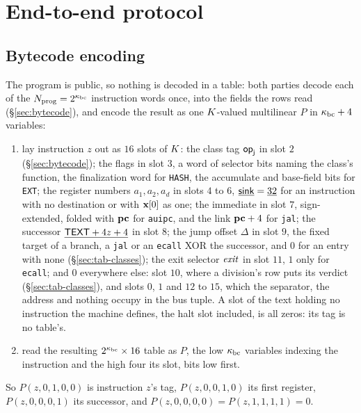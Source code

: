 \section{End-to-end protocol}\label{sec:e2e}

\subsection{Bytecode encoding}\label{sec:e2e-bc}

The program is public, so nothing is decoded in a table: both parties decode each of the $N_{\mathrm{prog}}=2^{\kappa_{\mathrm{bc}}}$ instruction words once, into the fields the rows read (\S\ref{sec:bytecode}), and encode the result as one $K$-valued multilinear $P$ in $\kappa_{\mathrm{bc}}+4$ variables:
\begin{enumerate}[itemsep=1pt,topsep=3pt]
\item lay instruction $z$ out as $16$ slots of $K$: the class tag $\mathsf{op}_{\mathsf{j}}$ in slot $2$ (\S\ref{sec:bytecode}); the flags in slot $3$, a word of selector bits naming the class's function, the finalization word for \texttt{HASH}, the accumulate and base-field bits for \texttt{EXT}; the register numbers $a_1,a_2,a_d$ in slots $4$ to $6$, $\underline{\mathsf{sink}}=\underline{32}$ for an instruction with no destination or with $\mathbf{x}[0]$ as one; the immediate in slot $7$, sign-extended, folded with $\mathbf{pc}$ for \texttt{auipc}, and the link $\mathbf{pc}+4$ for \texttt{jal}; the successor $\underline{\mathsf{TEXT}+4z+4}$ in slot $8$; the jump offset $\Delta$ in slot $9$, the fixed target of a branch, a \texttt{jal} or an \texttt{ecall} XOR the successor, and $0$ for an entry with none (\S\ref{sec:tab-classes}); the exit selector $\mathit{exit}$ in slot $11$, $1$ only for \texttt{ecall}; and $0$ everywhere else: slot $10$, where a division's row puts its verdict (\S\ref{sec:tab-classes}), and slots $0$, $1$ and $12$ to $15$, which the separator, the address and nothing occupy in the bus tuple. A slot of the text holding no instruction the machine defines, the halt slot included, is all zeros: its tag is no table's.
\item read the resulting $2^{\kappa_{\mathrm{bc}}}\times16$ table as $P$, the low $\kappa_{\mathrm{bc}}$ variables indexing the instruction and the high four its slot, bits low first.
\end{enumerate}
So $P(z,0,1,0,0)$ is instruction $z$'s tag, $P(z,0,0,1,0)$ its first register, $P(z,0,0,0,1)$ its successor, and $P(z,0,0,0,0)=P(z,1,1,1,1)=0$.

